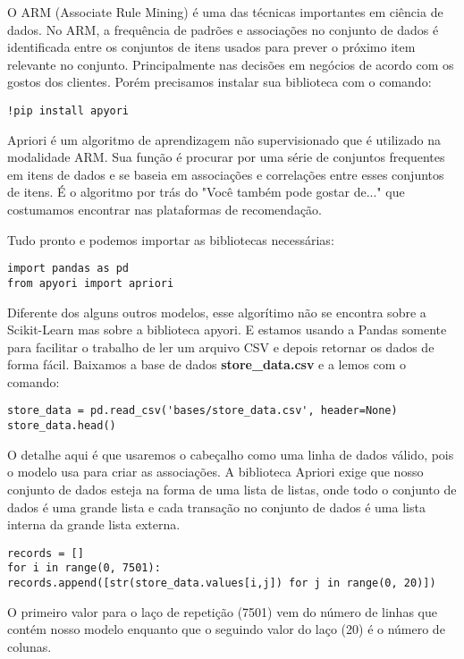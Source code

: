 O ARM (Associate Rule Mining) é uma das técnicas importantes em ciência de dados. No ARM, a frequência de padrões e associações no conjunto de dados é identificada entre os conjuntos de itens usados para prever o próximo item relevante no conjunto. Principalmente nas decisões em negócios de acordo com os gostos dos clientes. Porém precisamos instalar sua biblioteca com o comando:
\begin{lstlisting}[]
!pip install apyori
\end{lstlisting}

Apriori é um algoritmo de aprendizagem não supervisionado que é utilizado na modalidade ARM. Sua função é procurar por uma série de conjuntos frequentes em itens de dados e se baseia em associações e correlações entre esses conjuntos de itens. É o algoritmo por trás do "Você também pode gostar de..." que costumamos encontrar nas plataformas de recomendação.

Tudo pronto e podemos importar as bibliotecas necessárias:
\begin{lstlisting}[]
import pandas as pd
from apyori import apriori
\end{lstlisting}

Diferente dos alguns outros modelos, esse algorítimo não se encontra sobre a Scikit-Learn mas sobre a biblioteca apyori. E estamos usando a Pandas somente para facilitar o trabalho de ler um arquivo CSV e depois retornar os dados de forma fácil. Baixamos a base de dados \textbf{store\_data.csv} e a lemos com o comando:
\begin{lstlisting}[]
store_data = pd.read_csv('bases/store_data.csv', header=None)
store_data.head()
\end{lstlisting}

O detalhe aqui é que usaremos o cabeçalho como uma linha de dados válido, pois o modelo usa para criar as associações. A biblioteca Apriori exige que nosso conjunto de dados esteja na forma de uma lista de listas, onde todo o conjunto de dados é uma grande lista e cada transação no conjunto de dados é uma lista interna da grande lista externa.
\begin{lstlisting}[]
records = []
for i in range(0, 7501):
records.append([str(store_data.values[i,j]) for j in range(0, 20)])
\end{lstlisting}

O primeiro valor para o laço de repetição (7501) vem do número de linhas que contém nosso modelo enquanto que o seguindo valor do laço (20) é o número de colunas.

